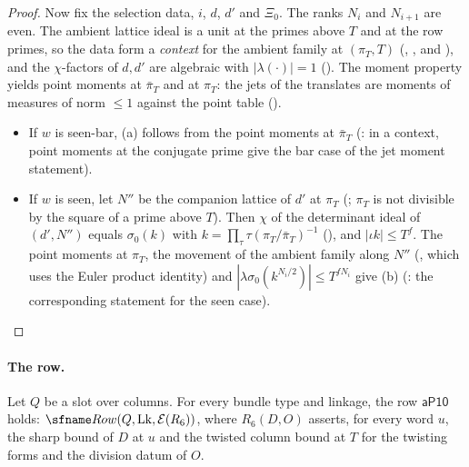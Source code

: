 \begin{proof}
Now fix the selection data, $i$, $d$, $d'$ and $\Xi_0$. The ranks $N_i$ and $N_{i+1}$ are even. The ambient lattice ideal is a unit at
the primes above $T$ and at the row primes, so the data form a \emph{context} for the ambient family at $(\pi_T,T)$
(, , and ),
and the $\chi$-factors of $d,d'$ are algebraic with $|\lambda(\cdot)|=1$
(). The moment property yields point moments at $\bar\pi_T$ and at $\pi_T$: the
jets of the translates are moments of measures of norm $\le1$ against the point table
().
\begin{itemize}
\item If $w$ is seen-bar, (a) follows from the point moments at $\bar\pi_T$ (: in a
context, point moments at the conjugate prime give the bar case of the jet moment statement).
\item If $w$ is seen, let $N''$ be the companion lattice of $d'$ at $\pi_T$ (;
$\pi_T$ is not divisible by the square of a prime above $T$). Then $\chi$ of the determinant ideal of $(d',N'')$ equals
$\sigma_0(k)$ with $k=\prod_\tau\tau(\pi_T/\bar\pi_T)^{-1}$ (), and
$|\iota k|\le T^f$. The point moments at $\pi_T$, the movement of the ambient family along $N''$
(, which uses the Euler product identity) and $|\lambda\sigma_0(k^{N_i/2})|\le T^{fN_i}$
give (b) (: the corresponding statement for the seen case).\qedhere
\end{itemize}
\end{proof}

\paragraph{The row.}

\begin{proposition}\label{pf:rows:levelrow}
Let $Q$ be a slot over columns. For every bundle type and linkage, the row $\mathsf{aP10}$ holds: $\rowsRow(Q,\rowsLk,\rowsEvC(R_6))$,
where $R_6(D,O)$ asserts, for every word $u$, the sharp bound of $D$ at $u$ and the twisted column bound at $T$ for the twisting
forms and the division datum of $O$.
\end{proposition}

